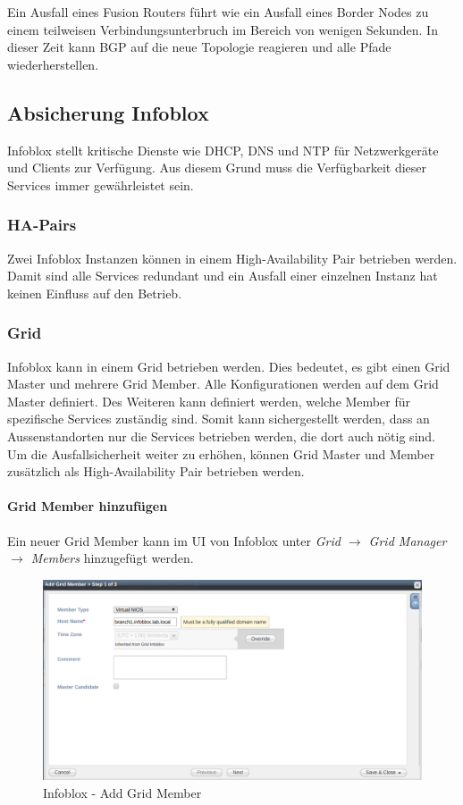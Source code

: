 Ein Ausfall eines Fusion Routers führt wie ein Ausfall eines Border Nodes zu einem teilweisen Verbindungsunterbruch im Bereich von wenigen Sekunden. In dieser Zeit kann BGP auf die neue Topologie reagieren und alle Pfade wiederherstellen.

\subsection{Absicherung Infoblox}

Infoblox stellt kritische Dienste wie DHCP, DNS und NTP für Netzwerkgeräte und Clients zur Verfügung. Aus diesem Grund muss die Verfügbarkeit dieser Services immer gewährleistet sein.

\subsubsection{HA-Pairs}
Zwei Infoblox Instanzen können in einem High-Availability Pair betrieben werden. Damit sind alle Services redundant und ein Ausfall einer einzelnen Instanz hat keinen Einfluss auf den Betrieb. 

\subsubsection{Grid}
Infoblox kann in einem Grid betrieben werden. Dies bedeutet, es gibt einen Grid Master und mehrere Grid Member. Alle Konfigurationen werden auf dem Grid Master definiert. Des Weiteren kann definiert werden, welche Member für spezifische Services zuständig sind. Somit kann sichergestellt werden, dass an Aussenstandorten nur die Services betrieben werden, die dort auch nötig sind. Um die Ausfallsicherheit weiter zu erhöhen, können Grid Master und Member zusätzlich als High-Availability Pair betrieben werden.

\paragraph{Grid Member hinzufügen}

Ein neuer Grid Member kann im UI von Infoblox unter \textit{Grid $\rightarrow$ Grid Manager $\rightarrow$ Members} hinzugefügt werden.

\begin{figure}[H]
	\centering
	\includegraphics[width=1\linewidth]{img/Absicherung/Infoblox_Add_Grid_Member.png}
	\caption{Infoblox - Add Grid Member}
	\label{fig:Infoblox - Add Grid Member}
\end{figure}

